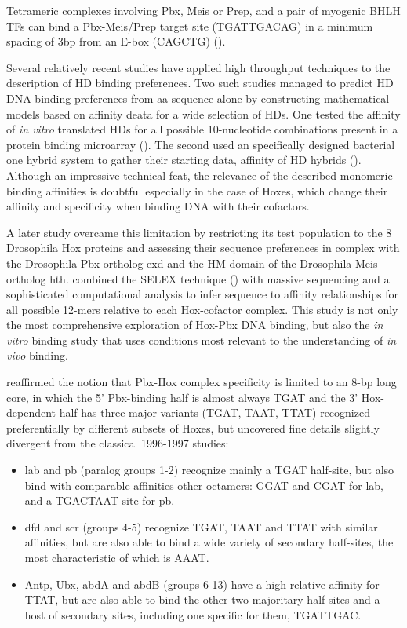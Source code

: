 Tetrameric complexes involving Pbx, Meis or Prep, and a pair of myogenic \ac{BHLH} \acp{TF} can bind a Pbx-Meis/Prep target site (TGATTGACAG) in a minimum spacing of 3bp from an E-box (CAGCTG) (\cite{Knoepfler1999}).
	
Several relatively recent studies have applied high throughput techniques to the description of \ac{HD} binding preferences. Two such studies managed to predict \ac{HD} DNA binding preferences from \ac{aa} sequence alone by constructing mathematical models based on affinity deata for a wide selection of \acp{HD}. One tested the affinity of \textit{in vitro} translated \acp{HD} for all possible 10-nucleotide combinations present in a protein binding microarray (\cite{Berger2008}). The second used an specifically designed bacterial one hybrid system to gather their starting data, affinity of \ac{HD} hybrids (\cite{Noyes2008}). Although an impressive technical feat, the relevance of the described monomeric binding affinities is doubtful especially in the case of Hoxes, which change their affinity and specificity when binding DNA with their cofactors. 

A later study overcame this limitation by restricting its test population to the 8 Drosophila Hox proteins and assessing their sequence preferences in complex with the Drosophila Pbx ortholog \ac{exd} and the HM domain of the Drosophila Meis ortholog \ac{hth}. \textcite{Slattery2011} combined the SELEX technique (\cite{Tuerk1990}) with massive sequencing and a sophisticated computational analysis to infer sequence to affinity relationships for all possible 12-mers relative to each Hox-cofactor complex. This study is not only the most comprehensive exploration of Hox-Pbx DNA binding, but also the \textit{in vitro} binding study that uses conditions most relevant to the understanding of \textit{in vivo} binding. 

\textcite{Slattery2011} reaffirmed the notion that Pbx-Hox complex specificity is limited to an 8-bp long core, in which the 5' Pbx-binding half is almost always TGAT and the 3' Hox-dependent half has three major variants (TGAT, TAAT, TTAT) recognized preferentially by different subsets of Hoxes, but uncovered fine details slightly divergent from the classical 1996-1997 studies:

\begin{itemize}

\item lab and pb (paralog groups 1-2) recognize mainly a TGAT half-site, but also bind with comparable affinities other octamers: GGAT and CGAT for lab, and a TGACTAAT site for pb. 

\item dfd and scr (groups 4-5) recognize TGAT, TAAT and TTAT with similar affinities, but are also able to bind a wide variety of secondary half-sites, the most characteristic of which is AAAT.

\item Antp, Ubx, abdA and abdB (groups 6-13) have a high relative affinity for TTAT, but are also able to bind the other two majoritary half-sites and a host of secondary sites, including one specific for them, TGATTGAC.  

\end{itemize}


